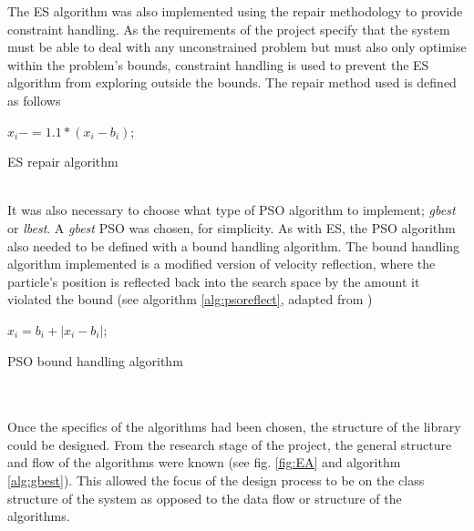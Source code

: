 The ES algorithm was also implemented using the repair methodology to provide constraint handling. As the requirements of the project specify that the system must be able to deal with any unconstrained problem but must also only optimise within the problem's bounds, constraint handling is used to prevent the ES algorithm from exploring outside the bounds. The repair method used is defined as follows
\begin{algorithm}[h]
\label{alg:esrepair}
  \SetAlgoLined
   {
    $x_{i} -= 1.1 * (x_{i} - b_{i})$;
  } 
  \caption{ES repair algorithm}
\end{algorithm}
\\It was also necessary to choose what type of PSO algorithm to implement; \emph{gbest} or \emph{lbest}. A \emph{gbest} PSO was chosen, for simplicity.  As with ES, the PSO algorithm also needed to be defined with a bound handling algorithm. The bound handling algorithm implemented is a modified version of velocity reflection, where the particle's position is reflected back into the search space by the amount it violated the bound (see algorithm \ref{alg:psoreflect}, adapted from \cite{reflect})
\begin{algorithm}[h]
\label{alg:psoreflect}
  \SetAlgoLined
   {
    { 
      $x_{i} = b_{i} + |x_{i} - b_{i}|$;
    }
  } 
  \caption{PSO bound handling algorithm}
\end{algorithm}
\\\\Once the specifics of the algorithms had been chosen, the structure of the library could be designed. From the research stage of the project, the general structure and flow of the algorithms were known (see fig. \ref{fig:EA} and algorithm \ref{alg:gbest}). This allowed the focus of the design process to be on the class structure of the system as opposed to the data flow or structure of the algorithms.


